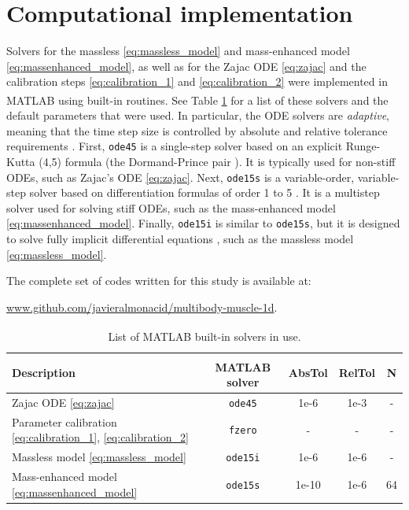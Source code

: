 \documentclass{sfuthesis}
\numberwithin{equation}{section}
\numberwithin{figure}{chapter}
\numberwithin{table}{chapter}
\theoremstyle{definition}
\newcommand{\matlab}{MATLAB\textsuperscript{\textcopyright} }
\begin{document}
\section{Computational implementation}

Solvers for the massless \eqref{eq:massless_model} and mass-enhanced model \eqref{eq:massenhanced_model}, as well as for the Zajac ODE \eqref{eq:zajac} and the calibration steps \eqref{eq:calibration_1} and \eqref{eq:calibration_2} were implemented in \matlab using built-in routines. See Table \ref{tab:matlab_solvers} for a list of these solvers and the default parameters that were used. In particular, the ODE solvers are \textit{adaptive}, meaning that the time step size is controlled by absolute and relative tolerance requirements \cite{ShampineReichelt1997}. First, \texttt{ode45} is a single-step solver based on an explicit Runge-Kutta (4,5) formula (the Dormand-Prince pair \cite{DormandPrince1980}). It is typically used for non-stiff ODEs, such as Zajac's ODE \eqref{eq:zajac}. Next, \texttt{ode15s} is a variable-order, variable-step solver based on differentiation formulas of order 1 to 5 \cite{ShampineReichelt1997}. It is a multistep solver used for solving stiff ODEs, such as the mass-enhanced model \eqref{eq:massenhanced_model}. Finally, \texttt{ode15i} is similar to \texttt{ode15s}, but it is designed to solve fully implicit differential equations \cite{Shampine2002}, such as the massless model \eqref{eq:massless_model}.

The complete set of codes written for this study is available at:
\begin{center}
    \url{www.github.com/javieralmonacid/multibody-muscle-1d}.
\end{center} 

\begin{table}
    \centering
    \begin{tabular}{|l|c|c|c|c|}\hline
        Description & \matlab solver & AbsTol & RelTol & N \\\hline
        Zajac ODE \eqref{eq:zajac} & \texttt{ode45} & 1e-6 & 1e-3 & - \\\hline
        Parameter calibration \eqref{eq:calibration_1}, \eqref{eq:calibration_2} & \texttt{fzero} & - & - & - \\\hline
        Massless model \eqref{eq:massless_model} & \texttt{ode15i} & 1e-6 & 1e-6 & - \\\hline
        Mass-enhanced model \eqref{eq:massenhanced_model} & \texttt{ode15s} & 1e-10 & 1e-6 & 64 \\\hline
    \end{tabular}
    \caption{List of \matlab built-in solvers in use.}
    \label{tab:matlab_solvers}
\end{table}
\end{document}
